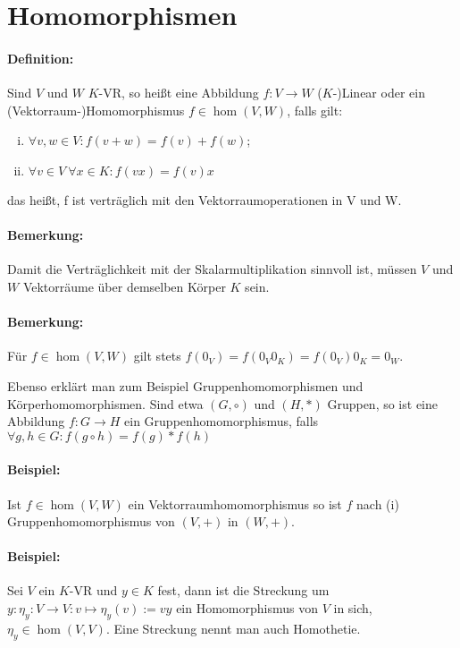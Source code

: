 \section{Homomorphismen}
\paragraph{Definition:}
	Sind $ V $ und $ W $ $ K $-VR, so heißt eine Abbildung $f: V \rightarrow W$ ($ K $-)Linear oder ein (Vektorraum-)Homomorphismus $f\in \hom(V,W)$, falls gilt:

\begin{enumerate}[(i)]
	\item $\forall v,w \in V: f(v+w) = f(v) + f(w)$;
	\item $\forall v\in V\ \forall x\in K: f(vx) = f(v)x$
\end{enumerate}

    das heißt, f ist verträglich mit den Vektorraumoperationen in V und W.
    
\paragraph{Bemerkung:}
	Damit die Verträglichkeit mit der Skalarmultiplikation sinnvoll ist, müssen $ V $ und $ W $ Vektorräume über demselben Körper $ K $ sein.

\paragraph{Bemerkung:}
	Für $f\in \hom(V,W)$ gilt stets $f(0_V) = f(0_V0_K) = f(0_V)0_K = 0_W$.
  
  Ebenso erklärt man zum Beispiel Gruppenhomomorphismen und Körperhomomorphismen. Sind etwa $(G,\circ)$ und $(H,*)$ Gruppen, so ist eine Abbildung $f: G \to H$ ein Gruppenhomomorphismus, falls $\forall g,h \in G: f(g\circ h) = f(g) * f(h)$
  
\paragraph{Beispiel:}
	Ist $f\in \hom(V,W)$ ein Vektorraumhomomorphismus so ist $ f $ nach (i) Gruppenhomomorphismus von $ (V,+) $ in $ (W,+) $.
  
\paragraph{Beispiel:}
	Sei $ V $ ein $ K $-VR und $y\in K$ fest, dann ist die Streckung um $y: \eta_y:V\to V: v\mapsto \eta_y(v) := vy$ ein Homomorphismus von $ V $ in sich, $\eta_y\in \hom(V,V)$. Eine Streckung nennt man auch Homothetie.
  	
